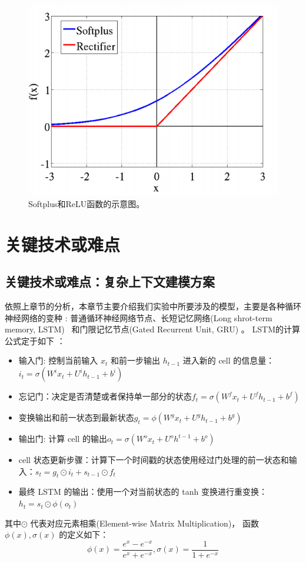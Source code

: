 \documentclass[master,openright,twoside,color]{buaathesis}
\begin{document}
\begin{figure}
  \centering
\includegraphics[width=0.5\linewidth]{./figures/softplus.png}
\caption{Softplus和ReLU函数的示意图。}\label{fig:soft}
\end{figure}

\section{关键技术或难点}

\subsection{关键技术或难点：复杂上下文建模方案}
依照上章节的分析，本章节主要介绍我们实验中所要涉及的模型，主要是各种循环神经网络的变种 \cite{DBLP:conf/icml/JozefowiczZS15}: 普通循环神经网络节点、长短记忆网络(Long shrot-term memory, LSTM)~\cite{DBLP:journals/taslp/SundermeyerNS15} 和门限记忆节点(Gated Recurrent Unit, GRU) \cite{DBLP:conf/nips/ChungKDGCB15}。 LSTM的计算公式定于如下 \cite{DBLP:journals/neco/HochreiterS97}：
\begin{itemize}
\item 输入门: 控制当前输入 $x_t$ 和前一步输出 $h_{t−1}$ 进入新的 cell 的信息量：$i_t=\sigma(W^i x_t+U^i h_{t-1}+b^i)$
\item  忘记门：决定是否清楚或者保持单一部分的状态$f_t=\sigma(W^f x_t+U^f h_{t-1}+b^f)$
\item  变换输出和前一状态到最新状态$g_t=\phi(W^g x_t+U^g h_{t-1}+b^g)$
\item  输出门: 计算 cell 的输出$o_t=\sigma(W^o x_t+U^o h^{t-1}+b^o)$
\item  cell 状态更新步骤：计算下一个时间戳的状态使用经过门处理的前一状态和输入：$s_t=g_t\odot i_t+s_{t-1}\odot f_t$
\item  最终 LSTM 的输出：使用一个对当前状态的 tanh 变换进行重变换：$h_t=s_t\odot \phi(o_t)$
\end{itemize}
其中$\odot$ 代表对应元素相乘(Element-wise Matrix Multiplication)， 函数 $\phi(x), \sigma(x)$ 的定义如下：
\begin{equation}\label{equ:tanh}
  \phi(x)=\frac{e^x-e^{-x}}{e^x+e^{-x}},\sigma(x)=\frac{1}{1+e^{-x}}
\end{equation}
\end{document}
